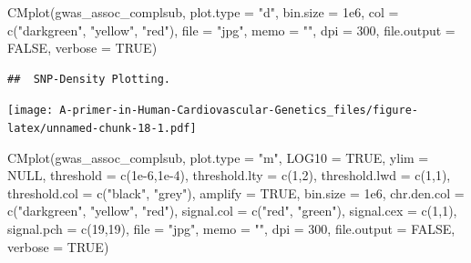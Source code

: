 \documentclass[
]{book}
\newenvironment{Shaded}{\begin{snugshade}}{\end{snugshade}}
\newcommand{\AttributeTok}[1]{\textcolor[rgb]{0.77,0.63,0.00}{#1}}
\newcommand{\ConstantTok}[1]{\textcolor[rgb]{0.00,0.00,0.00}{#1}}
\newcommand{\DecValTok}[1]{\textcolor[rgb]{0.00,0.00,0.81}{#1}}
\newcommand{\FloatTok}[1]{\textcolor[rgb]{0.00,0.00,0.81}{#1}}
\newcommand{\FunctionTok}[1]{\textcolor[rgb]{0.00,0.00,0.00}{#1}}
\newcommand{\NormalTok}[1]{#1}
\newcommand{\StringTok}[1]{\textcolor[rgb]{0.31,0.60,0.02}{#1}}
\begin{document}
\begin{Shaded}
\begin{Highlighting}[]
\FunctionTok{CMplot}\NormalTok{(gwas\_assoc\_complsub,}
       \AttributeTok{plot.type =} \StringTok{"d"}\NormalTok{,}
       \AttributeTok{bin.size =} \FloatTok{1e6}\NormalTok{, }\AttributeTok{col =} \FunctionTok{c}\NormalTok{(}\StringTok{"darkgreen"}\NormalTok{, }\StringTok{"yellow"}\NormalTok{, }\StringTok{"red"}\NormalTok{),}
       \AttributeTok{file =} \StringTok{"jpg"}\NormalTok{, }\AttributeTok{memo =} \StringTok{""}\NormalTok{, }\AttributeTok{dpi =} \DecValTok{300}\NormalTok{, }\AttributeTok{file.output =} \ConstantTok{FALSE}\NormalTok{, }\AttributeTok{verbose =} \ConstantTok{TRUE}\NormalTok{)}
\end{Highlighting}
\end{Shaded}

\begin{verbatim}
##  SNP-Density Plotting.
\end{verbatim}

\texttt{[image: A-primer-in-Human-Cardiovascular-Genetics\_files/figure-latex/unnamed-chunk-18-1.pdf]}

\begin{Shaded}
\begin{Highlighting}[]
\FunctionTok{CMplot}\NormalTok{(gwas\_assoc\_complsub,}
       \AttributeTok{plot.type =} \StringTok{"m"}\NormalTok{, }\AttributeTok{LOG10 =} \ConstantTok{TRUE}\NormalTok{, }\AttributeTok{ylim =} \ConstantTok{NULL}\NormalTok{,}
       \AttributeTok{threshold =} \FunctionTok{c}\NormalTok{(}\FloatTok{1e{-}6}\NormalTok{,}\FloatTok{1e{-}4}\NormalTok{), }\AttributeTok{threshold.lty =} \FunctionTok{c}\NormalTok{(}\DecValTok{1}\NormalTok{,}\DecValTok{2}\NormalTok{), }\AttributeTok{threshold.lwd =} \FunctionTok{c}\NormalTok{(}\DecValTok{1}\NormalTok{,}\DecValTok{1}\NormalTok{), }\AttributeTok{threshold.col =} \FunctionTok{c}\NormalTok{(}\StringTok{"black"}\NormalTok{, }\StringTok{"grey"}\NormalTok{),}
       \AttributeTok{amplify =} \ConstantTok{TRUE}\NormalTok{,}
       \AttributeTok{bin.size =} \FloatTok{1e6}\NormalTok{, }\AttributeTok{chr.den.col =} \FunctionTok{c}\NormalTok{(}\StringTok{"darkgreen"}\NormalTok{, }\StringTok{"yellow"}\NormalTok{, }\StringTok{"red"}\NormalTok{),}
       \AttributeTok{signal.col =} \FunctionTok{c}\NormalTok{(}\StringTok{"red"}\NormalTok{, }\StringTok{"green"}\NormalTok{), }\AttributeTok{signal.cex =} \FunctionTok{c}\NormalTok{(}\DecValTok{1}\NormalTok{,}\DecValTok{1}\NormalTok{), }\AttributeTok{signal.pch =} \FunctionTok{c}\NormalTok{(}\DecValTok{19}\NormalTok{,}\DecValTok{19}\NormalTok{),}
       \AttributeTok{file =} \StringTok{"jpg"}\NormalTok{, }\AttributeTok{memo =} \StringTok{""}\NormalTok{, }\AttributeTok{dpi =} \DecValTok{300}\NormalTok{, }\AttributeTok{file.output =} \ConstantTok{FALSE}\NormalTok{, }\AttributeTok{verbose =} \ConstantTok{TRUE}\NormalTok{)}
\end{Highlighting}
\end{Shaded}
\end{document}
